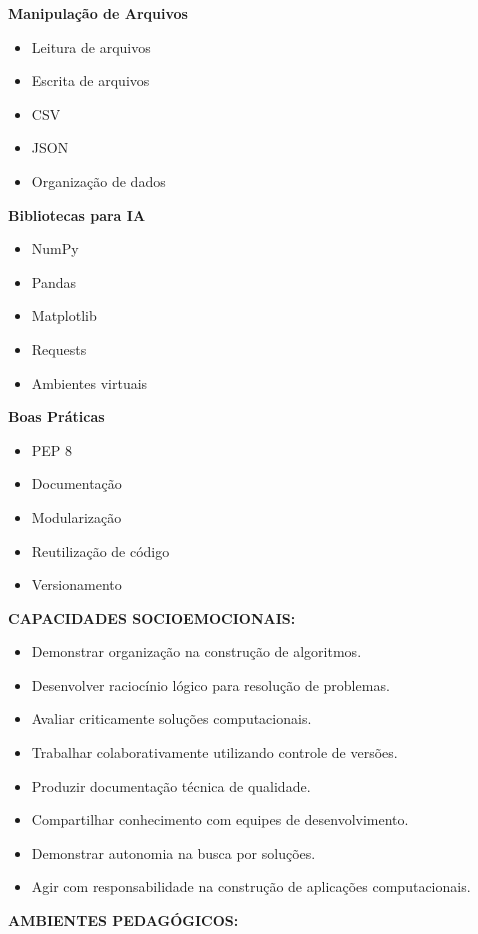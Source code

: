 \textbf{Manipulação de Arquivos}

\begin{itemize}
\item Leitura de arquivos
\item Escrita de arquivos
\item CSV
\item JSON
\item Organização de dados
\end{itemize}

\textbf{Bibliotecas para IA}

\begin{itemize}
\item NumPy
\item Pandas
\item Matplotlib
\item Requests
\item Ambientes virtuais
\end{itemize}

\textbf{Boas Práticas}

\begin{itemize}
\item PEP 8
\item Documentação
\item Modularização
\item Reutilização de código
\item Versionamento
\end{itemize}

\textbf{CAPACIDADES SOCIOEMOCIONAIS:}

\begin{itemize}
\item Demonstrar organização na construção de algoritmos.
\item Desenvolver raciocínio lógico para resolução de problemas.
\item Avaliar criticamente soluções computacionais.
\item Trabalhar colaborativamente utilizando controle de versões.
\item Produzir documentação técnica de qualidade.
\item Compartilhar conhecimento com equipes de desenvolvimento.
\item Demonstrar autonomia na busca por soluções.
\item Agir com responsabilidade na construção de aplicações computacionais.
\end{itemize}

\textbf{AMBIENTES PEDAGÓGICOS:}

